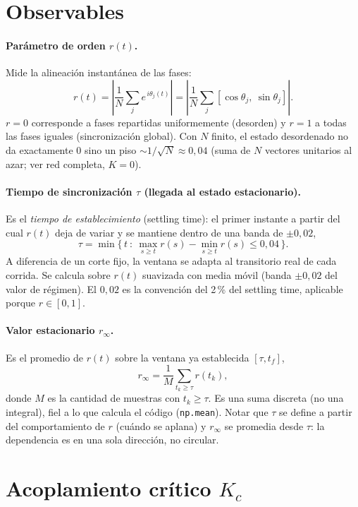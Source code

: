 \documentclass[11pt,a4paper]{article}
\begin{document}
\section{Observables}

\paragraph{Parámetro de orden $r(t)$.}
Mide la alineación instantánea de las fases:
\[
  r(t) = \left| \frac{1}{N} \sum_j e^{\,i\theta_j(t)} \right|
       = \left| \frac{1}{N} \sum_j [\cos\theta_j,\ \sin\theta_j] \right|.
\]
$r=0$ corresponde a fases repartidas uniformemente (desorden) y $r=1$ a todas
las fases iguales (sincronización global). Con $N$ finito, el estado
desordenado no da exactamente $0$ sino un piso $\sim 1/\sqrt{N} \approx 0{,}04$
(suma de $N$ vectores unitarios al azar; ver red completa, $K=0$).

\paragraph{Tiempo de sincronización $\tau$ (llegada al estado estacionario).}
Es el \emph{tiempo de establecimiento} (settling time): el primer instante a
partir del cual $r(t)$ deja de variar y se mantiene dentro de una banda de
$\pm 0{,}02$,
\[
  \tau = \min\Big\{\, t \ :\ \max_{s \ge t} r(s) - \min_{s \ge t} r(s) \le 0{,}04 \,\Big\}.
\]
A diferencia de un corte fijo, la ventana se adapta al transitorio real de cada
corrida. Se calcula sobre $r(t)$ suavizada con media móvil (banda $\pm 0{,}02$
del valor de régimen). El $0{,}02$ es la convención del 2\,\% del settling time,
aplicable porque $r \in [0,1]$.

\paragraph{Valor estacionario $r_\infty$.}
Es el promedio de $r(t)$ sobre la ventana ya establecida $[\tau, t_f]$,
\[
  r_\infty = \frac{1}{M} \sum_{t_k \ge \tau} r(t_k),
\]
donde $M$ es la cantidad de muestras con $t_k \ge \tau$. Es una suma discreta
(no una integral), fiel a lo que calcula el código (\texttt{np.mean}). Notar que
$\tau$ se define a partir del comportamiento de $r$ (cuándo se aplana) y
$r_\infty$ se promedia desde $\tau$: la dependencia es en una sola dirección,
no circular.

\section{Acoplamiento crítico $K_c$}
\end{document}
